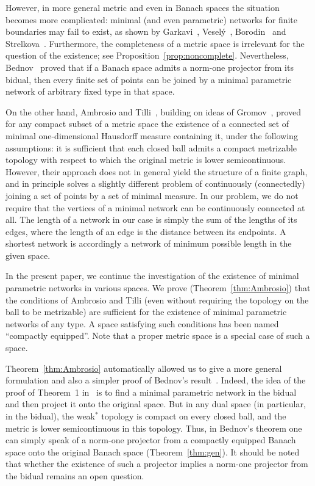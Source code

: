 \documentclass{svproc}
\begin{document}
However, in more general metric and even in Banach spaces the situation becomes more complicated: minimal (and even parametric) networks for finite boundaries may fail to exist, as shown by Garkavi~\cite{Garkavi}, Vesel\'{y}~\cite{Vesely}, Borodin~\cite{Borodin} and Strelkova~\cite{Bednov}. Furthermore, the completeness of a metric space is irrelevant for the question of the existence; see Proposition~\ref{prop:noncomplete}. Nevertheless, Bednov~\cite{Bednov} proved that if a Banach space admits a norm-one projector from its bidual, then every finite set of points can be joined by a minimal parametric network of arbitrary fixed type in that space.

On the other hand, Ambrosio and Tilli~\cite{Ambrosio}, building on ideas of Gromov~\cite{Gromov}, proved for any compact subset of a metric space the existence of a connected set of minimal one-dimensional Hausdorff measure containing it, under the following assumptions: it is sufficient that each closed ball admits a compact metrizable topology with respect to which the original metric is lower semicontinuous. However, their approach does not in general yield the structure of a finite graph, and in principle solves a slightly different problem of continuously (connectedly) joining a set of points by a set of minimal measure. In our problem, we do not require that the vertices of a minimal network can be continuously connected at all. The length of a network in our case is simply the sum of the lengths of its edges, where the length of an edge is the distance between its endpoints. A shortest network is accordingly a network of minimum possible length in the given space.

In the present paper, we continue the investigation of the existence of minimal parametric networks in various spaces. We prove (Theorem~\ref{thm:Ambrosio}) that the conditions of Ambrosio and Tilli (even without requiring the topology on the ball to be metrizable) are sufficient for the existence of minimal parametric networks of any type. A space satisfying such conditions has been named ``compactly equipped''. Note that a proper metric space is a special case of such a space.

Theorem~\ref{thm:Ambrosio} automatically allowed us to give a more general formulation and also a simpler proof of Bednov's result~\cite{Bednov}. Indeed, the idea of the proof of Theorem~1 in~\cite{Bednov} is to find a minimal parametric network in the bidual and then project it onto the original space. But in any dual space (in particular, in the bidual), the weak$^*$ topology is compact on every closed ball, and the metric is lower semicontinuous in this topology. Thus, in Bednov's theorem one can simply speak of a norm-one projector from a compactly equipped Banach space onto the original Banach space (Theorem~\ref{thm:gen}). It should be noted that whether the existence of such a projector implies a norm-one projector from the bidual remains an open question.
\end{document}
